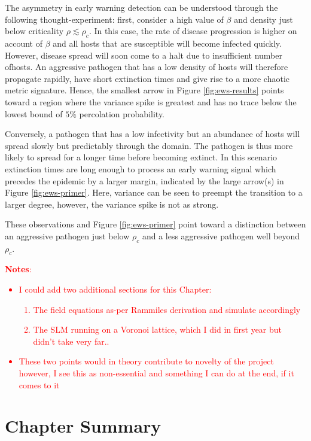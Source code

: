 The asymmetry in early warning detection can be understood through the following thought-experiment: %
first, consider a high value of $\beta$ and density just below criticality $\rho\lesssim\rho_c$. %
In this case, the rate of disease progression is higher on account of $\beta$ and all hosts %
that are susceptible will become infected quickly. %
However, disease spread will soon come to a halt due to insufficient number ofhosts. %
An aggressive pathogen that has a low density of hosts will therefore propagate rapidly, %
have short extinction times and give rise to a more chaotic metric signature. %
Hence, the smallest arrow in Figure \ref{fig:ews-results} points toward a region where the %
variance spike is greatest and has no trace below the lowest bound of $5\%$ percolation probability. %

Conversely, a pathogen that has a low infectivity but an abundance of hosts will spread %
slowly but predictably through the domain. The pathogen is thus more likely to spread for a longer time before becoming extinct. In this scenario extinction times are long enough to process an early warning signal which precedes the epidemic by a larger margin, indicated by the large arrow(s) in Figure \ref{fig:ews-primer}. Here, variance can be seen to preempt the transition to a larger degree, however, the variance spike is not as strong.
 
These observations and Figure \ref{fig:ews-primer} point toward a distinction between an %
aggressive pathogen just below $\rho_c$ and a less aggressive pathogen well beyond $\rho_c$. %
 
 \textcolor{red}{
 \textbf{Notes}:
 \begin{itemize}
     \item I could add two additional sections for this Chapter:
     \begin{enumerate}
         \item The field equations as-per Rammiles derivation and simulate accordingly
         \item The SLM running on a Voronoi lattice, which I did in first year but didn't take very far..
     \end{enumerate}
    \item These two points would in theory contribute to novelty of the project however, I see this as non-essential and something I can do at the end, if it comes to it
 \end{itemize}}
 
\section{Chapter Summary}

